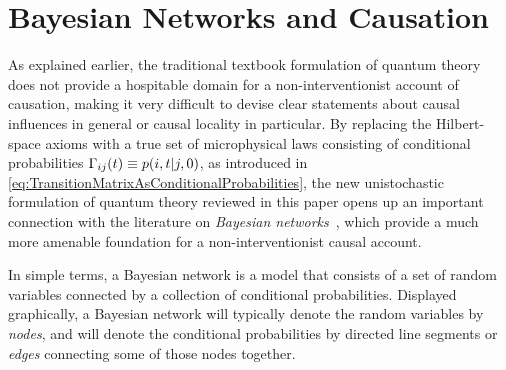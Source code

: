 \documentclass[12pt,english,prl,superscriptaddress,nobibnotes,nofootinbib]{revtex4-2}
\let\originalleft\left
\let\originalright\right
\renewcommand{\left}{\mathopen{}\mathclose\bgroup\originalleft}
\renewcommand{\right}{\aftergroup\egroup\originalright}
\begin{document}
\section{Bayesian Networks and Causation\label{sec:Bayesian-Networks-and-Causation}}

As explained earlier, the traditional textbook formulation of quantum
theory does not provide a hospitable domain for a non-interventionist
account of causation, making it very difficult to devise clear statements
about causal influences in general or causal locality in particular.
By replacing the Hilbert-space axioms with a true set of microphysical
laws consisting of conditional probabilities $\stochasticmatrix_{ij}\left(t\right)\defeq p\left(i,t\given j,0\right)$,
as introduced in \eqref{eq:TransitionMatrixAsConditionalProbabilities},
the new unistochastic formulation of quantum theory reviewed in this
paper opens up an important connection with the literature on \emph{Bayesian networks}~\citep{Pearl:2009cmrai},
which provide a much more amenable foundation for a non-interventionist
causal account.

In simple terms, a Bayesian network is a model that consists of a
set of random variables connected by a collection of conditional probabilities.
Displayed graphically, a Bayesian network will typically denote the
random variables by \emph{nodes}, and will denote the conditional
probabilities by directed line segments or \emph{edges} connecting
some of those nodes together.
\end{document}
